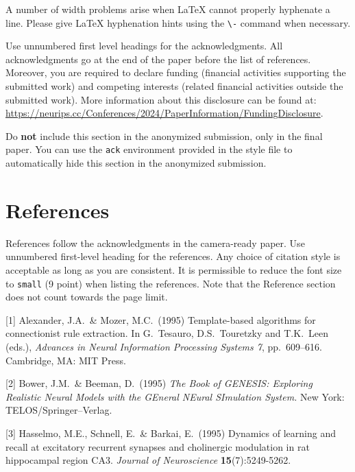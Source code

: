 \documentclass{article}
\begin{document}
	
	A number of width problems arise when \LaTeX{} cannot properly hyphenate a
	line. Please give LaTeX hyphenation hints using the \verb+\-+ command when
	necessary.
	
	\begin{ack}
		Use unnumbered first level headings for the acknowledgments. All acknowledgments
		go at the end of the paper before the list of references. Moreover, you are required to declare
		funding (financial activities supporting the submitted work) and competing interests (related financial activities outside the submitted work).
		More information about this disclosure can be found at: \url{https://neurips.cc/Conferences/2024/PaperInformation/FundingDisclosure}.
		
		
		Do {\bf not} include this section in the anonymized submission, only in the final paper. You can use the \texttt{ack} environment provided in the style file to automatically hide this section in the anonymized submission.
	\end{ack}
	
	\section*{References}
	
	
	References follow the acknowledgments in the camera-ready paper. Use unnumbered first-level heading for
	the references. Any choice of citation style is acceptable as long as you are
	consistent. It is permissible to reduce the font size to \verb+small+ (9 point)
	when listing the references.
	Note that the Reference section does not count towards the page limit.
	\medskip
	
	
	{
		\small
		
		
		[1] Alexander, J.A.\ \& Mozer, M.C.\ (1995) Template-based algorithms for
		connectionist rule extraction. In G.\ Tesauro, D.S.\ Touretzky and T.K.\ Leen
		(eds.), {\it Advances in Neural Information Processing Systems 7},
		pp.\ 609--616. Cambridge, MA: MIT Press.
		
		
		[2] Bower, J.M.\ \& Beeman, D.\ (1995) {\it The Book of GENESIS: Exploring
			Realistic Neural Models with the GEneral NEural SImulation System.}  New York:
		TELOS/Springer--Verlag.
		
		
		[3] Hasselmo, M.E., Schnell, E.\ \& Barkai, E.\ (1995) Dynamics of learning and
		recall at excitatory recurrent synapses and cholinergic modulation in rat
		hippocampal region CA3. {\it Journal of Neuroscience} {\bf 15}(7):5249-5262.
	}
	
\end{document}
